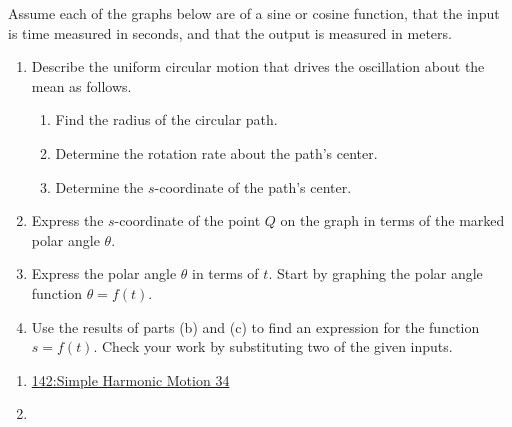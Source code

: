 \documentclass{ximera}
\begin{document}
\begin{exercise} \label{ELDKFeef}
Assume each of the graphs below are of a sine or cosine function, that the input is time measured in seconds, and that the output is measured in meters.

\begin{enumerate}

\item Describe the uniform circular motion that drives the oscillation about the mean as follows.
 
\begin{enumerate}
\item Find the radius of the circular path.

\item Determine the rotation rate about the path's center.

\item Determine the $s$-coordinate of the path's center.

\end{enumerate}

\item Express the $s$-coordinate of the point $Q$ on the graph in terms of the marked polar angle $\theta$.

\item Express the polar angle $\theta$ in terms of $t$. Start by graphing the polar angle function $\theta = f(t)$.

\item Use the results of parts (b) and (c) to find an expression for the function $s=f(t)$. Check your work by substituting two of the given inputs.



\end{enumerate}

\begin{enumerate}

\item \href{https://www.desmos.com/calculator/4f6673ba8a}{142:Simple Harmonic Motion 34}



 
\begin{onlineOnly}
    \begin{center}
\end{center}
\end{onlineOnly}


\item 


\end{enumerate}
\end{exercise}
\end{document}
